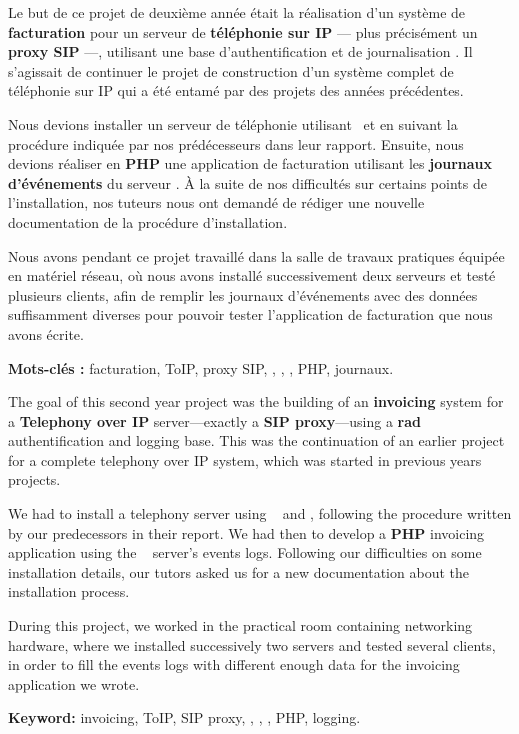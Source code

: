 

Le but de ce projet de deuxième année était la réalisation d’un système de \textbf{facturation} pour un serveur de \textbf{téléphonie sur IP} — plus précisément un \textbf{proxy SIP} —, \textbf{\kam} utilisant une base d’authentification et de journalisation \textbf{\rad}. Il s’agissait de continuer le projet de construction d’un système complet de téléphonie sur IP qui a été entamé par des projets des années précédentes.

Nous devions installer un serveur de téléphonie utilisant \kam~et \textbf{\frad} en suivant la procédure indiquée par nos prédécesseurs dans leur rapport. Ensuite, nous devions réaliser en \textbf{PHP} une application de facturation utilisant les \textbf{journaux d’événements} du serveur \rad. À la suite de nos difficultés sur certains points de l’installation, nos tuteurs nous ont demandé de rédiger une nouvelle documentation de la procédure d’installation.

Nous avons pendant ce projet travaillé dans la salle de travaux pratiques équipée en matériel réseau, où nous avons installé successivement deux serveurs et testé plusieurs clients, afin de remplir les journaux d’événements avec des données suffisamment diverses pour pouvoir tester l’application de facturation que nous avons écrite.

\begin{itshape}
\noindent\textbf{Mots-clés :} facturation, ToIP, proxy SIP, \kam, \rad, \frad, PHP, journaux.
\end{itshape}


The goal of this second year project was the building of an \textbf{invoicing} system for a \textbf{Telephony over IP} server—exactly a \textbf{SIP proxy}—using a \textbf{rad} authentification and logging base. This was the continuation of an earlier project for a complete telephony over IP system, which was started in previous years projects.

We had to install a telephony server using \kam~ and \textbf{\frad}, following the procedure written by our predecessors in their report. We had then to develop a \textbf{PHP} invoicing application using the \rad~ server’s events logs. Following our difficulties on some installation details, our tutors asked us for a new documentation about the installation process.

During this project, we worked in the practical room containing networking hardware, where we installed successively two servers and tested several clients, in order to fill the events logs with different enough data for the invoicing application we wrote.

\begin{itshape}
\noindent\textbf{Keyword:} invoicing, ToIP, SIP proxy, \kam, \rad, \frad, PHP, logging.
\end{itshape}

\restoregeometry
